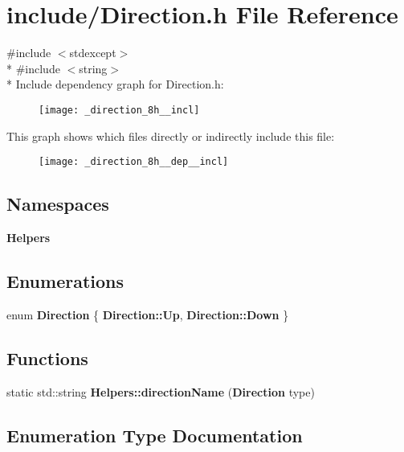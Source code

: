 \section{include/\+Direction.h File Reference}
\label{_direction_8h}
{\ttfamily \#include $<$stdexcept$>$}\\*
{\ttfamily \#include $<$string$>$}\\*
Include dependency graph for Direction.\+h\+:\nopagebreak
\begin{figure}[H]
\begin{center}
\leavevmode
\texttt{[image: \_direction\_8h\_\_incl]}
\end{center}
\end{figure}
This graph shows which files directly or indirectly include this file\+:\nopagebreak
\begin{figure}[H]
\begin{center}
\leavevmode
\texttt{[image: \_direction\_8h\_\_dep\_\_incl]}
\end{center}
\end{figure}
\subsection*{Namespaces}
\begin{DoxyCompactItemize}
\item 
 {\bf Helpers}
\end{DoxyCompactItemize}
\subsection*{Enumerations}
\begin{DoxyCompactItemize}
\item 
enum {\bf Direction} \{ {\bf Direction\+::\+Up}, 
{\bf Direction\+::\+Down}
 \}
\end{DoxyCompactItemize}
\subsection*{Functions}
\begin{DoxyCompactItemize}
\item 
static std\+::string {\bf Helpers\+::direction\+Name} ({\bf Direction} type)
\end{DoxyCompactItemize}


\subsection{Enumeration Type Documentation}
